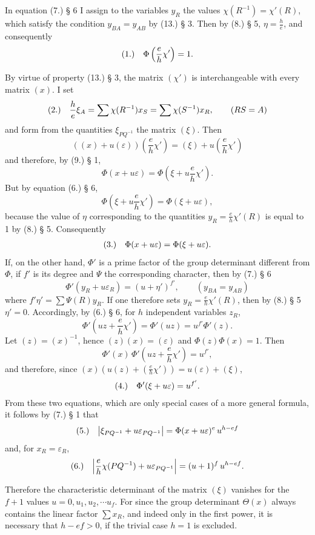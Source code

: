 \documentclass[11pt]{article}
\makeatletter
\newcommand{\frobtag}[2]{\[\begin{array}{@{}r@{\quad}l@{}}\textup{(#1)} & \displaystyle #2\end{array}\]}
\newcommand{\frobtagc}[2]{\[\begin{array}{@{}r@{\quad}c@{}}\textup{(#1)} & \displaystyle #2\end{array}\]}
\makeatother
\begin{document}
In equation (7.) § 6 I assign to the variables $y_R$ the values $\chi(R^{-1})=\chi'(R)$, which satisfy the condition $y_{BA}=y_{AB}$ by (13.) § 3. Then by (8.) § 5, $\eta=\frac{h}{e}$, and consequently
\frobtagc{1.}{\Phi\left(\frac{e}{h}\chi'\right)=1.}

By virtue of property (13.) § 3, the matrix $(\chi')$ is interchangeable with every matrix $(x)$. I set
\frobtag{2.}{\frac{h}{e}\xi_A=\sum\chi(R^{-1})x_S=\sum\chi(S^{-1})x_R,\qquad (RS=A)}
and form from the quantities $\xi_{PQ^{-1}}$ the matrix $(\xi)$. Then
\[
((x)+u(\varepsilon))\left(\frac{e}{h}\chi'\right)=(\xi)+u\left(\frac{e}{h}\chi'\right)
\]
and therefore, by (9.) § 1,
\[
\Phi(x+u\varepsilon)=\Phi\left(\xi+u\frac{e}{h}\chi'\right).
\]
But by equation (6.) § 6,
\[
\Phi\left(\xi+u\frac{e}{h}\chi'\right)=\Phi(\xi+u\varepsilon),
\]
because the value of $\eta$ corresponding to the quantities $y_R=\frac{e}{h}\chi'(R)$ is equal to 1 by (8.) § 5. Consequently
\frobtagc{3.}{\Phi(x+u\varepsilon)=\Phi(\xi+u\varepsilon).}
If, on the other hand, $\Phi'$ is a prime factor of the group determinant different from $\Phi$, if $f'$ is its degree and $\Psi$ the corresponding character, then by (7.) § 6
\[
\Phi'(y_R+u\varepsilon_R)=(u+\eta')^{f'},\qquad (y_{BA}=y_{AB})
\]
where $f'\eta'=\sum\Psi(R)y_R$. If one therefore sets $y_R=\frac{e}{h}\chi'(R)$, then by (8.) § 5 $\eta'=0$. Accordingly, by (6.) § 6, for $h$ independent variables $z_R$,
\[
\Phi'\left(uz+\frac{e}{h}\chi'\right)=\Phi'(uz)=u^{f'}\Phi'(z).
\]
Let $(z)=(x)^{-1}$, hence $(z)(x)=(\varepsilon)$ and $\Phi(z)\Phi(x)=1$. Then
\[
\Phi'(x)\,\Phi'\left(uz+\frac{e}{h}\chi'\right)=u^{f'},
\]
and therefore, since $(x)(u(z)+(\frac{e}{h}\chi'))=u(\varepsilon)+(\xi)$,
\frobtagc{4.}{\Phi'(\xi+u\varepsilon)=u^{f'}.}
From these two equations, which are only special cases of a more general formula, it follows by (7.) § 1 that
\frobtagc{5.}{\left|\xi_{PQ^{-1}}+u\varepsilon_{PQ^{-1}}\right|=\Phi(x+u\varepsilon)^e\,u^{h-ef}}
and, for $x_R=\varepsilon_R$,
\frobtagc{6.}{\left|\frac{e}{h}\chi(PQ^{-1})+u\varepsilon_{PQ^{-1}}\right|=(u+1)^f\,u^{h-ef}.}

Therefore the characteristic determinant of the matrix $(\xi)$ vanishes for the $f+1$ values $u=0,u_1,u_2,\cdots u_f$. For since the group determinant $\Theta(x)$ always contains the linear factor $\sum x_R$, and indeed only in the first power, it is necessary that $h-ef>0$, if the trivial case $h=1$ is excluded.
\end{document}
